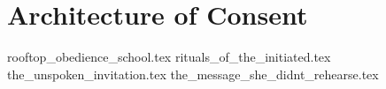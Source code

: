 \section{Architecture of Consent}


{rooftop_obedience_school.tex}
{rituals_of_the_initiated.tex}
{the_unspoken_invitation.tex}
{the_message_she_didnt_rehearse.tex}
